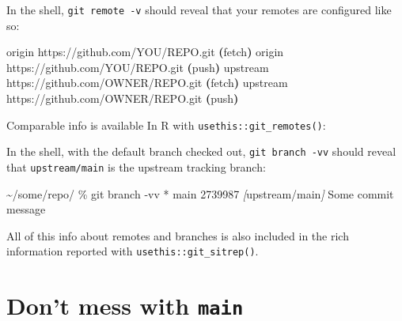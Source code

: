\documentclass[
]{book}
\newenvironment{Shaded}{\begin{snugshade}}{\end{snugshade}}
\newcommand{\AttributeTok}[1]{\textcolor[rgb]{0.13,0.29,0.53}{#1}}
\newcommand{\CommentTok}[1]{\textcolor[rgb]{0.56,0.35,0.01}{\textit{#1}}}
\newcommand{\ErrorTok}[1]{\textcolor[rgb]{0.64,0.00,0.00}{\textbf{#1}}}
\newcommand{\ExtensionTok}[1]{#1}
\newcommand{\FunctionTok}[1]{\textcolor[rgb]{0.13,0.29,0.53}{\textbf{#1}}}
\newcommand{\KeywordTok}[1]{\textcolor[rgb]{0.13,0.29,0.53}{\textbf{#1}}}
\newcommand{\NormalTok}[1]{#1}
\newcommand{\PreprocessorTok}[1]{\textcolor[rgb]{0.56,0.35,0.01}{\textit{#1}}}
\newcommand{\SpecialStringTok}[1]{\textcolor[rgb]{0.31,0.60,0.02}{#1}}
\begin{document}
In the shell, \texttt{git\ remote\ -v} should reveal that your remotes are configured like so:

\begin{Shaded}
\begin{Highlighting}[]
\ExtensionTok{origin}\NormalTok{    https://github.com/YOU/REPO.git }\ErrorTok{(}\ExtensionTok{fetch}\KeywordTok{)}
\ExtensionTok{origin}\NormalTok{    https://github.com/YOU/REPO.git }\ErrorTok{(}\ExtensionTok{push}\KeywordTok{)}
\ExtensionTok{upstream}\NormalTok{  https://github.com/OWNER/REPO.git }\ErrorTok{(}\ExtensionTok{fetch}\KeywordTok{)}
\ExtensionTok{upstream}\NormalTok{  https://github.com/OWNER/REPO.git }\ErrorTok{(}\ExtensionTok{push}\KeywordTok{)}
\end{Highlighting}
\end{Shaded}

Comparable info is available In R with \texttt{usethis::git\_remotes()}:

\begin{Shaded}
\end{Shaded}

In the shell, with the default branch checked out, \texttt{git\ branch\ -vv} should reveal that \texttt{upstream/main} is the upstream tracking branch:

\begin{Shaded}
\begin{Highlighting}[]
\ExtensionTok{\textasciitilde{}/some/repo/}\NormalTok{ \% git branch }\AttributeTok{{-}vv}                   
\ExtensionTok{*}\NormalTok{ main 2739987 }\PreprocessorTok{[}\SpecialStringTok{upstream/main}\PreprocessorTok{]}\NormalTok{ Some commit message}
\end{Highlighting}
\end{Shaded}

All of this info about remotes and branches is also included in the rich information reported with \texttt{usethis::git\_sitrep()}.

\section{\texorpdfstring{Don't mess with \texttt{main}}{Don't mess with main}}\label{fork-dont-touch-main}
\end{document}

